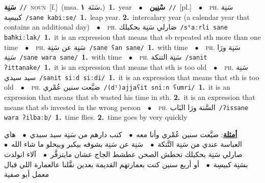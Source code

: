 \documentclass[10pt,a4paper,twoside]{article} %
\begin{document}
\begin{multicols}{2}
{\setlength\topsep{0pt}\textbf{\foreignlanguage{arabic}{سَنِة}}\ {\color{gray}\texttt{//}\color{black}}\ \textsc{noun}\ [f.]\ \color{gray}(msa. \foreignlanguage{arabic}{سَنَة}~\foreignlanguage{arabic}{\textbf{١.}})\color{black}\ \textbf{1.}~year\ \ $\bullet$\ \ \setlength\topsep{0pt}\textbf{\foreignlanguage{arabic}{سْنِين}}\ {\color{gray}\texttt{//}\color{black}}\ [pl.]\ \ $\bullet$\ \ \textsc{ph.} \color{gray} \foreignlanguage{arabic}{سَنِة كبيسِة}\color{black}\ {\color{gray}\texttt{/{\sffamily sane kabiːse}/}\color{black}}\ \textbf{1.}~leap year.  \textbf{2.}~intercalary year (a calendar year that contains an additional day)\ \ $\bullet$\ \ \textsc{ph.} \color{gray} \foreignlanguage{arabic}{صَارلي سَنِة بحكيلك}\color{black}\ {\color{gray}\texttt{/{\sffamily sˤaːrli sane baħkiːlak}/}\color{black}}\ \textbf{1.}~it is an expression that means that sb repeated sth more than one time\ \ $\bullet$\ \ \textsc{ph.} \color{gray} \foreignlanguage{arabic}{سَنِة عن سَنِة}\color{black}\ {\color{gray}\texttt{/{\sffamily sane ʕan sane}/}\color{black}}\ \textbf{1.}~with time\ \ $\bullet$\ \ \textsc{ph.} \color{gray} \foreignlanguage{arabic}{سَنِة ورَا سَنِة}\color{black}\ {\color{gray}\texttt{/{\sffamily sane wara sane}/}\color{black}}\ \textbf{1.}~with time\ \ $\bullet$\ \ \textsc{ph.} \color{gray} \foreignlanguage{arabic}{سَنِة التنكة}\color{black}\ {\color{gray}\texttt{/{\sffamily sanit ʔittanake}/}\color{black}}\ \textbf{1.}~it is an expression that means that sth is too old\ \ $\bullet$\ \ \textsc{ph.} \color{gray} \foreignlanguage{arabic}{سَنِة سيد سيدي}\color{black}\ {\color{gray}\texttt{/{\sffamily sanit siːd siːdi}/}\color{black}}\ \textbf{1.}~it is an expression that means that sth is too old\ \ $\bullet$\ \ \textsc{ph.} \color{gray} \foreignlanguage{arabic}{ضيَّعت سنين عُمْري}\color{black}\ {\color{gray}\texttt{/{\sffamily (dˤ)ajjaʕit sniːn ʕumri}/}\color{black}}\ \textbf{1.}~it is an expression that means that sb wasted his time in sth.  \textbf{2.}~it is an expression that means that sb invested in the wrong person\ \ $\bullet$\ \ \textsc{ph.} \color{gray} \foreignlanguage{arabic}{السَّنة ورَا البَاب}\color{black}\ {\color{gray}\texttt{/{\sffamily ʔissane wara ʔilbaːb}/}\color{black}}\ \textbf{1.}~time flies.  \textbf{2.}~time goes by very quickly\  \begin{flushright}\color{gray}\foreignlanguage{arabic}{\textbf{\underline{\foreignlanguage{arabic}{أمثلة}}}: ضيَّعت سنين عُمْري وأنا معه\ $\bullet$\ \  كنب دارهم من سَنِة سيد سيدي\ $\bullet$\ \  هاي العباسة عندي من سَنِة التَّنكة\ $\bullet$\ \  سَنِة عن سَنِة بشوفه بيكبر وبيحلو ما شاء الله\ $\bullet$\ \  صارلي سَنِة بحكيلك تحطش الصحن عطشط الجاج عشان مايتزفَّر\ $\bullet$\ \  آلاء انولدت بسَنِة كبيسِة\ $\bullet$\ \  أو أربع سنين كنت بعمارتهم القديمة بعدين نقَّلنا عالعمارة اللي قبال معمل أبو صفية}\end{flushright}\color{black}} \vspace{2mm}


\end{multicols}
\end{document}
